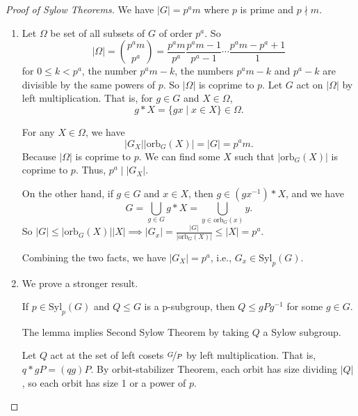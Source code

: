 \begin{proof}[Proof of Sylow Theorems]
    We have \(\left\vert G \right\vert = p^a m\) where \(p\) is prime and \(p\nmid m\).
    \begin{enumerate}
        \item Let \(\Omega\) be set of all subsets of \(G\) of order \(p^a\). So
        \[
            \left\vert \Omega \right\vert =\binom{p^a m}{p^a} = \frac{p^a m}{p^a} \frac{p^a m - 1}{p^a - 1}\cdots \frac{p^a m - p^a + 1}{1}
        \]
        for \(0 \leq k < p^a\), the number \(p^a m - k\), the numbers \(p^a m - k\) and \(p^a - k\) are divisible by the same powers of \(p\). So \(\left\vert \Omega \right\vert \) is coprime to \(p\). Let \(G\) act on \(\left\vert \Omega \right\vert \) by left multiplication. That is, for \(g \in G\) and \(X \in \Omega\),
        \[g * X = \{gx \mid x \in X\} \in \Omega.\]

        For any \(X \in \Omega\), we have
        \[
            \left\vert G_X \right\vert \left\vert \mathrm{orb}_G(X) \right\vert =\left\vert G \right\vert =p^a m.
        \]
        Because \(\left\vert \Omega \right\vert \) is coprime to \(p\). We can find some \(X\) such that \(\left\vert \mathrm{orb}_G(X) \right\vert \) is coprime to \(p\). Thus, \(p^a \mid \left\vert G_X \right\vert \).

        On the other hand, if \(g \in G\) and \(x \in X\), then \(g \in (gx^{-1})*X\), and we have
        \[
            G = \bigcup_{g\in G}g *X = \bigcup_{y\in \mathrm{orb}_G(x)}y.
        \]
        So \(\left\vert G \right\vert \leq  \left\vert \mathrm{orb}_G(X) \right\vert \left\vert X \right\vert\implies \left\vert G_x \right\vert = \frac{\left\vert G \right\vert}{\left\vert \mathrm{orb}_G(X) \right\vert} \leq \left\vert X \right\vert =p^a \).

        Combining the two facts, we have \(\left\vert G_X \right\vert =p^a\), i.e., \(G_x \in \mathrm{Syl}_p(G)\).
        \item We prove a stronger result.
        \begin{lemma}
            If \(p \in \mathrm{Syl}_p(G)\) and \(Q \leq G\) is a p-subgroup, then \(Q \leq gPg^{-1}\) for some \(g \in G\).
        \end{lemma}
        The lemma implies Second Sylow Theorem by taking \(Q\) a Sylow subgroup.

        Let \(Q\) act at the set of left cosets \(\nicefrac{G}{P}\) by left multiplication. That is, \(q * gP = (qg)P\). By orbit-stabilizer Theorem, each orbit has size dividing \(\left\vert Q \right\vert\), so each orbit has size 1 or a power of \(p\).


\end{enumerate}
\end{proof}
